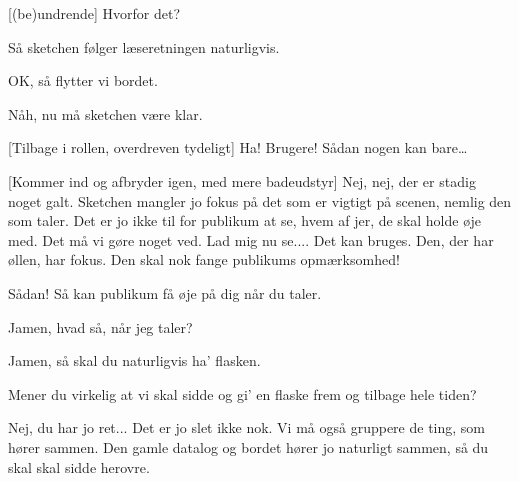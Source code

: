 \documentclass[a4paper,11pt]{article}
\begin{document}
\begin{sketch}
  [(be)undrende] Hvorfor det?
  
   Så sketchen følger læseretningen naturligvis.
  
  
   OK, så flytter vi bordet.
  
  
  
   Nåh, nu må sketchen være klar.
  
  [Tilbage i rollen, overdreven tydeligt] Ha! 
  Brugere!  Sådan nogen kan bare\ldots
  
  [Kommer ind og afbryder igen, med mere badeudstyr] Nej,
  nej, der er stadig noget galt. Sketchen mangler jo fokus på det som
  er vigtigt på scenen, nemlig den som taler. Det er jo ikke til for
  publikum at se, hvem af jer, de skal holde øje med. Det må vi gøre
  noget ved.  Lad mig nu se....  Det kan bruges. Den, der har øllen, har
  fokus. Den skal nok fange publikums opmærksomhed!
  
  
   Sådan! Så kan publikum få øje på dig når du taler.
  
   Jamen, hvad så, når jeg taler?
  
    Jamen, så skal du naturligvis ha' flasken.
  
   Mener du virkelig at vi skal sidde og gi' en flaske frem og
  tilbage hele tiden?
  
   Nej, du har jo ret...  Det er jo slet ikke nok. Vi må også gruppere
  de ting, som hører sammen. Den gamle datalog og bordet hører jo
  naturligt sammen, så du skal  skal sidde herovre.
  
  

\end{sketch}
\end{document}
